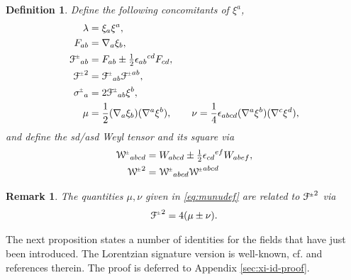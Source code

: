 \documentclass[a4paper,11pt,reqno]{amsart}
\theoremstyle{plain}
\newtheorem{definition}[thm]{Definition}
\newtheorem{remark}[thm]{Remark}
\newcommand{\PM}[1]{{{#1}^{\hspace{-.5pt}\scaleto{\pm}{3.5pt}}}}
\def\Wcal{\mathcal{W}}
\def\Fcal{\mathcal{F}}
\numberwithin{equation}{section}
\begin{document}
\begin{definition}
Define the following concomitants of $\xi^{a}$,
\begin{subequations} \label{eq:concomitatns} 
\begin{align}
\lambda  ={}& \xi_{a} \xi^{a}, \label{def:lambda} \\
F_{ab}={}&\nabla_{a}\xi_{b}, \label{def:F_ab} \\
\PM{\Fcal}_{ab}={}&F_{ab} \pm \tfrac{1}{2} \epsilon_{ab}{}^{cd} F_{cd}, \label{def:Fcal_ab}\\
\PM{\Fcal}^2={}&\PM{\Fcal}_{ab} \PM{\Fcal}^{ab}, \label{def:Fcal2} \\
\PM{\sigma}_{a}={}&2 \PM{\Fcal}_{ab} \xi^{b}, \label{def:sigmaa} \\
\mu ={}& \frac{1}{2}(\nabla_a\xi_b)(\nabla^a\xi^b), \qquad
\nu = \frac{1}{4}\epsilon_{abcd}(\nabla^a\xi^b)(\nabla^c\xi^d), \label{eq:munudef}
\end{align}
\end{subequations}
and define the sd/asd Weyl tensor and its square via
\begin{align}
\PM{\Wcal}_{abcd} ={}& W_{abcd} \pm \tfrac{1}{2} \epsilon_{cd}{}^{ef} W_{abef}, \\
 \PM{\Wcal}^2 ={}& \PM{\Wcal}_{abcd}\PM{\Wcal}^{abcd} 
\end{align}
\end{definition} 
\begin{remark} 
The quantities $\mu, \nu$ given in \eqref{eq:munudef} are related to $\PM{\Fcal}^2$ via 
\begin{align}\label{eq:F2munu}
\PM{\Fcal}^2 = 4(\mu \pm \nu).
\end{align}
\end{remark} 

The next proposition states a number of identities for the fields that have just been introduced. The Lorentzian signature version  is well-known, cf.  \cite{Mars:2000:MR1779516} and references therein. The proof is deferred to Appendix \ref{sec:xi-id-proof}.
\end{document}
